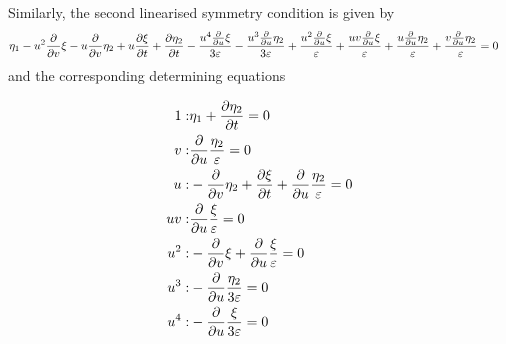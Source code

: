 Similarly, the second linearised symmetry condition is given by
\begin{align}
\eta_1 - u^{2} \pdv{}{v} \xi - u \pdv{}{v} \eta_2 + u \pdv{\xi}{t} + \pdv{\eta_2}{t} - \frac{u^{4} \pdv{}{u} \xi}{3 \varepsilon} - \frac{u^{3} \pdv{}{u} \eta_2}{3 \varepsilon} + \frac{u^{2} \pdv{}{u} \xi}{\varepsilon} + \frac{u v \pdv{}{u} \xi}{\varepsilon} + \frac{u \pdv{}{u} \eta_2}{\varepsilon} + \frac{v \pdv{}{u} \eta_2}{\varepsilon}&=0\label{eq:BZ_lin_sym_1}
\end{align}
and the corresponding determining equations

\begin{align*}
1:&\eta_1 + \pdv{\eta_2}{t}=0\\
v:&\pdv{}{u} \frac{\eta_2}{\varepsilon}=0\\
u:&- \pdv{}{v} \eta_2 + \pdv{\xi}{t} + \pdv{}{u} \frac{\eta_2}{\varepsilon}=0\\
u v:&\pdv{}{u} \frac{\xi}{\varepsilon}=0\\
u^{2}:&- \pdv{}{v} \xi + \pdv{}{u} \frac{\xi}{\varepsilon}=0\\
u^{3}:&- \pdv{}{u} \frac{\eta_2}{3 \varepsilon}=0\\
u^{4}:&- \pdv{}{u} \frac{\xi}{3 \varepsilon}=0\\
\end{align*}